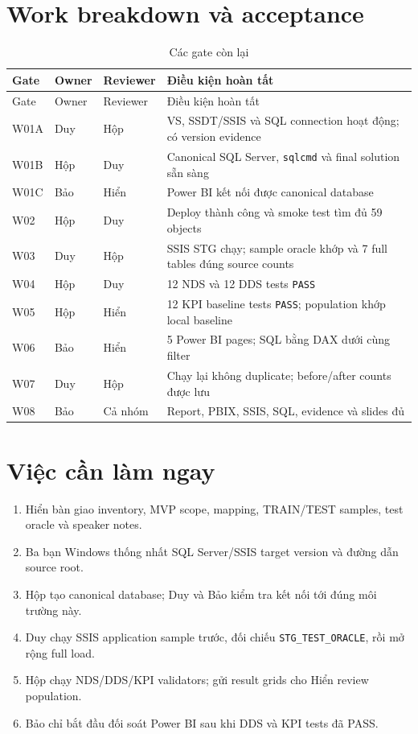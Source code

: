 \documentclass[11pt,a4paper]{article}
\begin{document}
\section{Work breakdown và acceptance}
\begin{longtable}{p{1.2cm}p{3.1cm}p{3.0cm}p{7.0cm}}
\caption{Các gate còn lại}\label{tab:gates}\\
\toprule
Gate & Owner & Reviewer & Điều kiện hoàn tất \\
\midrule
\endfirsthead
\toprule Gate & Owner & Reviewer & Điều kiện hoàn tất \\
\midrule
\endhead
W01A & Duy & Hộp & VS, SSDT/SSIS và SQL connection hoạt động; có version evidence \\
W01B & Hộp & Duy & Canonical SQL Server, \texttt{sqlcmd} và final solution sẵn sàng \\
W01C & Bảo & Hiển & Power BI kết nối được canonical database \\
W02 & Hộp & Duy & Deploy thành công và smoke test tìm đủ 59 objects \\
W03 & Duy & Hộp & SSIS STG chạy; sample oracle khớp và 7 full tables đúng source counts \\
W04 & Hộp & Duy & 12 NDS và 12 DDS tests \texttt{PASS} \\
W05 & Hộp & Hiển & 12 KPI baseline tests \texttt{PASS}; population khớp local baseline \\
W06 & Bảo & Hiển & 5 Power BI pages; SQL bằng DAX dưới cùng filter \\
W07 & Duy & Hộp & Chạy lại không duplicate; before/after counts được lưu \\
W08 & Bảo & Cả nhóm & Report, PBIX, SSIS, SQL, evidence và slides đủ \\
\bottomrule
\end{longtable}

\section{Việc cần làm ngay}
\begin{enumerate}[label=\textbf{Bước \arabic*:}]
  \item Hiển bàn giao inventory, MVP scope, mapping, TRAIN/TEST samples, test oracle và speaker notes.
  \item Ba bạn Windows thống nhất SQL Server/SSIS target version và đường dẫn source root.
  \item Hộp tạo canonical database; Duy và Bảo kiểm tra kết nối tới đúng môi trường này.
  \item Duy chạy SSIS application sample trước, đối chiếu \texttt{STG\_TEST\_ORACLE}, rồi mở rộng full load.
  \item Hộp chạy NDS/DDS/KPI validators; gửi result grids cho Hiển review population.
  \item Bảo chỉ bắt đầu đối soát Power BI sau khi DDS và KPI tests đã PASS.
\end{enumerate}
\end{document}
